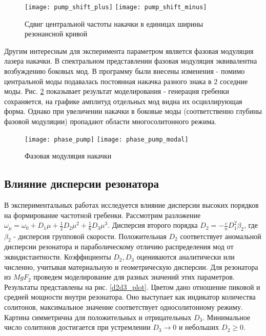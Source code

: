 \begin{figure}
  \centering
  \texttt{[image: pump\_shift\_plus]}
  \texttt{[image: pump\_shift\_minus]}
  \caption{Сдвиг центральной частоты накачки в единицах ширины резонансной кривой} \label{pump_shift}
\end{figure}

Другим интересным для эксперимента параметром является фазовая модуляция лазера накачки. В спектральном представлении фазовая модуляция эквивалентна возбуждению боковых мод. В программу были внесены изменения -  помимо центральной моды подавалась постоянная накачка разного знака в $2$ соседние моды. Рис. \ref{phase_pump} показывает результат моделирования - генерация гребенки сохраняется, на графике амплитуд отдельных мод видна их осциллирующая форма. Однако при увеличении накачки в боковые моды (соответственно глубины фазовой модуляции) пропадают области многосолитонного режима.

\begin{figure}
  \texttt{[image: phase\_pump]}
  \texttt{[image: phase\_pump\_modal]}
  \caption{Фазовая модуляция накачки} \label{phase_pump}
\end{figure}

\subsection{Влияние дисперсии резонатора}

В экспериментальных работах исследуется влияние дисперсии высоких порядков на формирование частотной гребенки. Рассмотрим разложение $\omega_\mu=\omega_0+D_1\mu+\frac{1}{2}D_2\mu^2+\frac{1}{6}D_3\mu^3$. Дисперсия второго порядка $D_2=-\frac{c}{n}D_1^2\beta_2$, где $\beta_2$ - дисперсия групповой скорости. Положительная $D_2$ соответствует аномальной дисперсии резонатора и параболическому отличию распределения мод от эквидистантности. Коэффициенты $D_2, D_3$ оцениваются аналитически или численно, учитывая материальную и геометрическую дисперсии. Для резонатора из $MgF_2$ проведем моделирование для разных значений этих параметров. Результаты представлены на рис. \ref{d2d3_plot}. Цветом дано отношение пиковой и средней мощности внутри резонатора. Оно выступает как индикатор количества солитонов, максимальное значение соответствует односолитонному режиму. Картина симметрична для положительных и отрицательных $D_3$. Минимальное число солитонов достигается при устремлении $D_3\rightarrow 0$ и небольших $D_2\ge0$.


